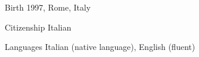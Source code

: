 

\begin{cvskills}

    \cvskill
        {Birth} %
        {1997, Rome, Italy} %


    \cvskill
        {Citizenship} %
        {Italian} %
    
    \cvskill
        {Languages} %
        {Italian (native language), English (fluent)} %

\end{cvskills}